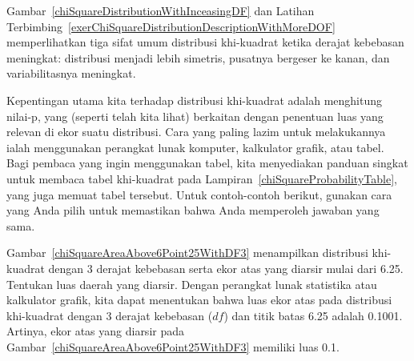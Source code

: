 
Gambar~\ref{chiSquareDistributionWithInceasingDF} dan Latihan Terbimbing~\ref{exerChiSquareDistributionDescriptionWithMoreDOF} memperlihatkan tiga sifat umum distribusi khi-kuadrat ketika derajat kebebasan meningkat: distribusi menjadi lebih simetris, pusatnya bergeser ke kanan, dan variabilitasnya meningkat.

Kepentingan utama kita terhadap distribusi khi-kuadrat
adalah menghitung nilai-p, yang (seperti telah kita lihat)
berkaitan dengan penentuan luas yang relevan di ekor
suatu distribusi.
Cara yang paling lazim untuk melakukannya ialah menggunakan perangkat lunak komputer,
kalkulator grafik, atau tabel.
Bagi pembaca yang ingin menggunakan tabel,
kita menyediakan panduan singkat untuk membaca tabel khi-kuadrat pada
Lampiran~\ref{chiSquareProbabilityTable},
yang juga memuat tabel tersebut.
Untuk contoh-contoh berikut, gunakan cara yang Anda pilih
untuk memastikan bahwa Anda memperoleh jawaban yang sama.

\begin{examplewrap}
\begin{nexample}{Gambar~\ref{chiSquareAreaAbove6Point25WithDF3}
    menampilkan distribusi khi-kuadrat dengan 3 derajat kebebasan
    serta ekor atas yang diarsir mulai dari 6.25.
    Tentukan luas daerah yang diarsir.}
  Dengan perangkat lunak statistika atau kalkulator grafik,
  kita dapat menentukan bahwa luas ekor atas pada distribusi khi-kuadrat
  dengan 3 derajat kebebasan ($df$)
  dan titik batas 6.25 adalah 0.1001.
  Artinya, ekor atas yang diarsir pada
  Gambar~\ref{chiSquareAreaAbove6Point25WithDF3}
  memiliki luas 0.1.
\end{nexample}
\end{examplewrap}

